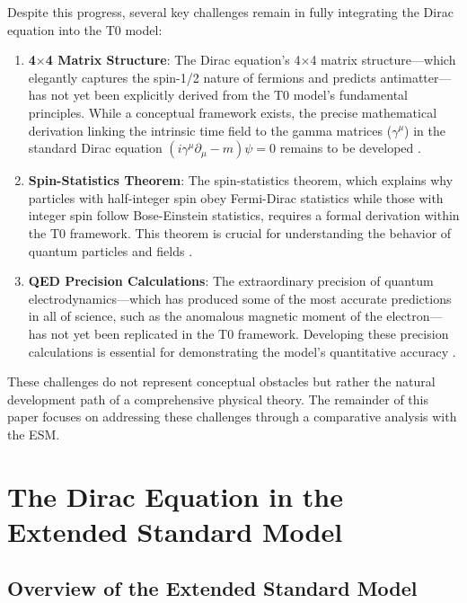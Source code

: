 \documentclass[12pt,a4paper]{article}
\begin{document}
	Despite this progress, several key challenges remain in fully integrating the Dirac equation into the T0 model:
	
	\begin{enumerate}
		\item \textbf{4$\times$4 Matrix Structure}: The Dirac equation's 4$\times$4 matrix structure—which elegantly captures the spin-1/2 nature of fermions and predicts antimatter—has not yet been explicitly derived from the T0 model's fundamental principles. While a conceptual framework exists, the precise mathematical derivation linking the intrinsic time field to the gamma matrices ($\gamma^{\mu}$) in the standard Dirac equation $(i\gamma^{\mu}\partial_{\mu} - m)\psi = 0$ remains to be developed \cite{pascher_pragmatic_2025}.
		
		\item \textbf{Spin-Statistics Theorem}: The spin-statistics theorem, which explains why particles with half-integer spin obey Fermi-Dirac statistics while those with integer spin follow Bose-Einstein statistics, requires a formal derivation within the T0 framework. This theorem is crucial for understanding the behavior of quantum particles and fields \cite{pascher_pragmatic_2025}.
		
		\item \textbf{QED Precision Calculations}: The extraordinary precision of quantum electrodynamics—which has produced some of the most accurate predictions in all of science, such as the anomalous magnetic moment of the electron—has not yet been replicated in the T0 framework. Developing these precision calculations is essential for demonstrating the model's quantitative accuracy \cite{pascher_pragmatic_2025}.
	\end{enumerate}
	
	These challenges do not represent conceptual obstacles but rather the natural development path of a comprehensive physical theory. The remainder of this paper focuses on addressing these challenges through a comparative analysis with the ESM.
	
	\section{The Dirac Equation in the Extended Standard Model}
	\label{sec:dirac_esm}
	
	\subsection{Overview of the Extended Standard Model}
	\label{subsec:esm_overview}
	
\end{document}

